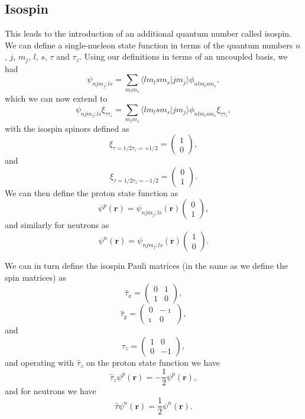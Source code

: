 \documentclass[graybox,sectrefs,envcountresetchap,open=right]{svmonodo}
\begin{document}
\subsection{Isospin}

This leads to the introduction of an additional quantum number called isospin.
We can define a single-nucleon
state function in terms of the quantum numbers $n$, $j$, $m_j$, $l$, $s$, $\tau$ and $\tau_z$. Using our definitions in terms of an uncoupled basis, we had 
\[
\psi_{njm_j;ls}=\sum_{m_lm_s}\langle lm_lsm_s|jm_j\rangle\phi_{nlm_lsm_s},
\]
which we can now extend to
\[
\psi_{njm_j;ls}\xi_{\tau\tau_z}=\sum_{m_lm_s}\langle lm_lsm_s|jm_j\rangle\phi_{nlm_lsm_s}\xi_{\tau\tau_z},
\]
with the isospin spinors defined as 
\[
\xi_{\tau=1/2\tau_z=+1/2}=\left(\begin{array}{c} 1  \\ 0\end{array}\right),
\]
and
\[
\xi_{\tau=1/2\tau_z=-1/2}=\left(\begin{array}{c} 0  \\ 1\end{array}\right).
\]
We can then define the proton state function as 
\[
\psi^p(\mathbf{r})  =\psi_{njm_j;ls}(\mathbf{r})\left(\begin{array}{c} 0  \\ 1\end{array}\right), 
\]
and similarly for neutrons as
\[
\psi^n(\mathbf{r})  =\psi_{njm_j;ls}(\mathbf{r})\left(\begin{array}{c} 1  \\ 0\end{array}\right). 
\]


We can in turn define the isospin Pauli matrices (in the same as we define the spin matrices) as
\[
\hat{\tau}_x =\left(\begin{array}{cc} 0 & 1 \\ 1 & 0 \end{array}\right),
\]
\[
\hat{\tau}_y =\left(\begin{array}{cc} 0 & -\imath \\ \imath & 0 \end{array}\right),
\]
and
\[
\hat{\tau}_z =\left(\begin{array}{cc} 1 & 0 \\ 0 & -1 \end{array}\right),
\]
and operating with $\hat{\tau}_z$ on the proton state function we have
\[
\hat{\tau}_z\psi^p(\mathbf{r})=-\frac{1}{2}\psi^p(\mathbf{r}),
\]
and for neutrons we have
\[
\hat{\tau}\psi^n(\mathbf{r})=\frac{1}{2}\psi^n(\mathbf{r}).
\]
\end{document}

